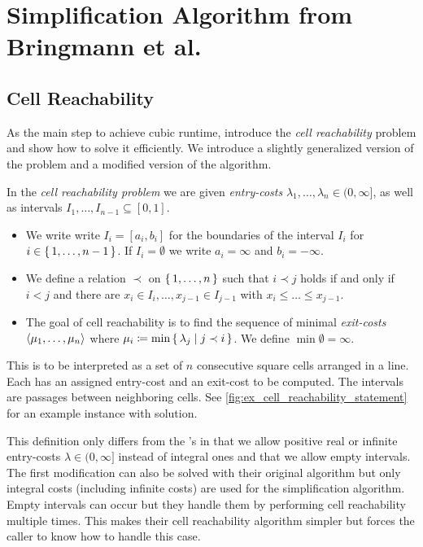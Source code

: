 \section{Simplification Algorithm from Bringmann et al.}
\label{sec:cubic_algo}


\subsection{Cell Reachability}
\label{ssec:cell_reachability}
As the main step to achieve cubic runtime, \citeauthor{polyline_simplification_has_cubic_complexity_bringmannetal} introduce the \emph{cell reachability} problem and show how to solve it efficiently. We introduce a slightly generalized version of the problem and a modified version of the algorithm. 

\begin{definition}
	In the \emph{cell reachability problem} we are given \emph{entry-costs} \(\lambda_1, \dots, \lambda_n \in (0, \infty]\), as well as intervals \(I_1, \dots, I_{n-1} \subseteq [0, 1]\). 

	\begin{itemize}
		\item We write write \(I_i = [a_i, b_i]\) for the boundaries of the interval \(I_i\) for \(i \in \set{1, \dots, n - 1}\). If \(I_i = \emptyset\) we write \(a_i = \infty\) and \(b_i = -\infty\).
	  
		\item We define a relation \(\prec\) on \(\set{1, \dots, n}\) such that \(i \prec j\) holds if and only if \(i < j\) and there are \(x_i \in I_i, \dots, x_{j-1} \in I_{j-1}\) with \(x_i \leq \dots \leq x_{j - 1}\).

		\item The goal of cell reachability is to find the sequence of minimal \emph{exit-costs} \(\left\langle\mu_1, \dots, \mu_n\right\rangle\) where \(\mu_i \coloneq \min \set{ \lambda_j \mid j \prec i}\). We define \(\min \emptyset = \infty\).
	\end{itemize}
\end{definition}

This is to be interpreted as a set of \(n\) consecutive square cells arranged in a line. Each has an assigned entry-cost and an exit-cost to be computed. The intervals are passages between neighboring cells. See \cref{fig:ex_cell_reachability_statement} for an example instance with solution.

This definition only differs from the \citeauthor{polyline_simplification_has_cubic_complexity_bringmannetal}'s in that we allow positive real or infinite entry-costs \(\lambda \in (0, \infty]\) instead of integral ones and that we allow empty intervals. The first modification can also be solved with their original algorithm but only integral costs (including infinite costs) are used for the simplification algorithm. Empty intervals can occur but they handle them by performing cell reachability multiple times.  This makes their cell reachability algorithm simpler but forces the caller to know how to handle this case.

